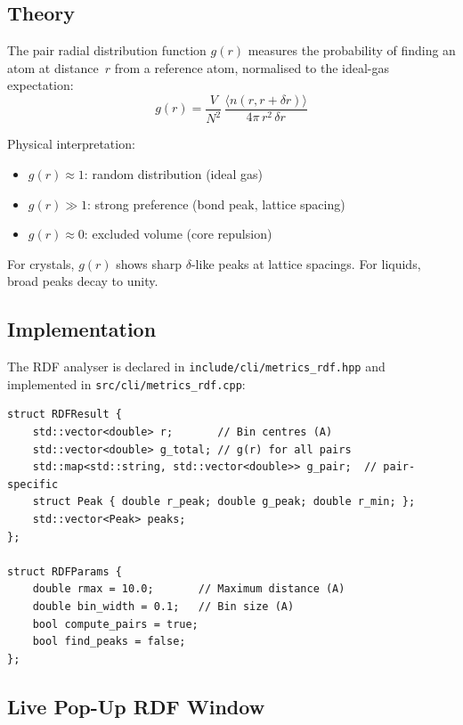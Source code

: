 \documentclass[11pt,a4paper]{article}
\begin{document}
\subsection{Theory}

The pair radial distribution function $g(r)$ measures the probability of
finding an atom at distance~$r$ from a reference atom, normalised to the
ideal-gas expectation:
\begin{equation}
  g(r) = \frac{V}{N^{2}}\,\frac{\langle n(r, r+\delta r)\rangle}
         {4\pi\,r^{2}\,\delta r}
  \label{eq:rdf}
\end{equation}

Physical interpretation:
\begin{itemize}
  \item $g(r) \approx 1$: random distribution (ideal gas)
  \item $g(r) \gg 1$: strong preference (bond peak, lattice spacing)
  \item $g(r) \approx 0$: excluded volume (core repulsion)
\end{itemize}

For crystals, $g(r)$ shows sharp $\delta$-like peaks at lattice spacings.
For liquids, broad peaks decay to unity.

\subsection{Implementation}

The RDF analyser is declared in \texttt{include/cli/metrics\_rdf.hpp} and
implemented in \texttt{src/cli/metrics\_rdf.cpp}:

\begin{lstlisting}[style=cpp,title={\textbf{C++ --- RDF data structures}}]
struct RDFResult {
    std::vector<double> r;       // Bin centres (A)
    std::vector<double> g_total; // g(r) for all pairs
    std::map<std::string, std::vector<double>> g_pair;  // pair-specific
    struct Peak { double r_peak; double g_peak; double r_min; };
    std::vector<Peak> peaks;
};

struct RDFParams {
    double rmax = 10.0;       // Maximum distance (A)
    double bin_width = 0.1;   // Bin size (A)
    bool compute_pairs = true;
    bool find_peaks = false;
};
\end{lstlisting}

\subsection{Live Pop-Up RDF Window}
\end{document}
